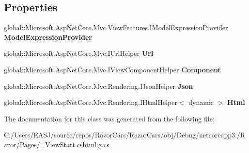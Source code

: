 \subsection*{Properties}
\begin{DoxyCompactItemize}
\item 
\mbox{\label{class_razor_cars_1_1_pages_1_1_pages_____view_start_a115610446a2b9f02d8649656e3d62ac9}} 
global\+::\+Microsoft.\+Asp\+Net\+Core.\+Mvc.\+View\+Features.\+I\+Model\+Expression\+Provider {\bfseries Model\+Expression\+Provider}
\item 
\mbox{\label{class_razor_cars_1_1_pages_1_1_pages_____view_start_a1116ddf4ddfd68fd568d63548360c7f9}} 
global\+::\+Microsoft.\+Asp\+Net\+Core.\+Mvc.\+I\+Url\+Helper {\bfseries Url}
\item 
\mbox{\label{class_razor_cars_1_1_pages_1_1_pages_____view_start_aa7952e6e7d2ef788529c9f0cc1253d1a}} 
global\+::\+Microsoft.\+Asp\+Net\+Core.\+Mvc.\+I\+View\+Component\+Helper {\bfseries Component}
\item 
\mbox{\label{class_razor_cars_1_1_pages_1_1_pages_____view_start_a566275b78f5941610ad55373c82cd522}} 
global\+::\+Microsoft.\+Asp\+Net\+Core.\+Mvc.\+Rendering.\+I\+Json\+Helper {\bfseries Json}
\item 
\mbox{\label{class_razor_cars_1_1_pages_1_1_pages_____view_start_a6c63614a4171c28b181fbe66bdf182aa}} 
global\+::\+Microsoft.\+Asp\+Net\+Core.\+Mvc.\+Rendering.\+I\+Html\+Helper$<$ dynamic $>$ {\bfseries Html}
\end{DoxyCompactItemize}


The documentation for this class was generated from the following file\+:\begin{DoxyCompactItemize}
\item 
C\+:/\+Users/\+E\+A\+S\+J/source/repos/\+Razor\+Cars/\+Razor\+Cars/obj/\+Debug/netcoreapp3./\+Razor/\+Pages/\+\_\+\+View\+Start.\+cshtml.\+g.\+cs\end{DoxyCompactItemize}
